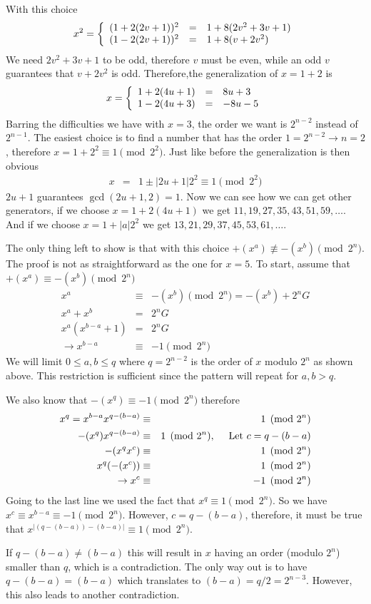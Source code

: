 \documentclass[aps,preprint,preprintnumbers,nofootinbib,showpacs,prd]{revtex4-1}
\newcommand{\ba}{\begin{array}}
\newcommand{\ea}{\end{array}}
\newcommand{\nbea}{\begin{eqnarray*}}
\newcommand{\neea}{\end{eqnarray*}}
\begin{document}
With this choice
%
\nbea
x^2 =  \left \{ \ba{l c l}
(1 + 2(2v+1))^2 & = & 1 + 8(2v^2 + 3v + 1) \\
(1 - 2(2v+1))^2 & = & 1 + 8(v + 2v^2)
\ea
\right.
\neea
%
We need $2v^2 + 3v + 1$ to be odd, therefore $v$ must be even, while an odd $v$ guarantees that $v + 2v^2$ is odd. Therefore,the generalization of $x = 1 + 2$ is
%
\nbea
x =  \left \{ \ba{l c l}
1 + 2(4u+1) & = & 8u + 3 \\
1 - 2(4u+3) & = & -8u - 5
\ea
\right.
\neea
%
Barring the difficulties we have with $x=3$, the order we want is $2^{n-2}$ instead of $2^{n-1}$. The easiest choice is to find a number that has the order $1 = 2^{n-2} \to n = 2$, therefore $x = 1 + 2^2 \equiv 1 \pmod{2^2}$. Just like before the generalization is then obvious
%
\nbea
x & = & 1 \pm |2u+1|2^2 \equiv 1 \pmod{2^2}
\neea
%
$2u+1$ guarantees $\gcd(2u+1,2) = 1$. Now we can see how we can get other generators, if we choose $x = 1 + 2(4u+1)$ we get $11, 19, 27, 35, 43, 51, 59, \dots$. And if we choose $x = 1 + |a|2^2$ we get $13, 21, 29, 37, 45, 53, 61, \dots$. 

The only thing left to show is that with this choice $+(x^a) \not\equiv -(x^b) \pmod{2^n}$. The proof is not as straightforward as the one for $x=5$. To start, assume that $+(x^a) \equiv -(x^b) \pmod{2^n}$
%
\nbea
x^a & \equiv & -(x^b) \pmod{2^n}  = -(x^b) + 2^n G\\
x^a + x^b & = & 2^n G \\
x^a(x^{b-a} + 1) & = & 2^n G \\
\to x^{b-a} & \equiv & -1 \pmod{2^n}
\neea
%
We will limit $0 \le a,b \le q$ where $q = 2^{n-2}$ is the order of $x$ modulo $2^n$ as shown above. This restriction is sufficient since the pattern will repeat for $a,b > q$.

We also know that $-(x^q) \equiv -1 \pmod{2^n}$ therefore
%
\nbea
x^q = x^{b-a} x ^{q - (b-a)} & \equiv & 1 \pmod{2^n} \\
-(x^q)x ^{q - (b-a)} & \equiv & 1 \pmod{2^n}, ~~~ {~\rm Let~} c = q - (b-a) \\
-(x^q x^c) & \equiv & 1 \pmod{2^n} \\
x^q (-(x^c)) & \equiv & 1 \pmod{2^n} \\
\to x^c & \equiv & -1 \pmod{2^n}
\neea
%
Going to the last line we used the fact that $x^q \equiv 1 \pmod{2^n}$. So we have $x^c \equiv x^{b-a} \equiv -1 \pmod{2^n}$. However, $c = q - (b-a)$, therefore, it must be true that $x^{|(q - (b-a)) - (b-a)|} \equiv 1 \pmod{2^n}$.

If $q - (b - a) \neq (b-a)$ this will result in $x$ having an order (modulo $2^n$) smaller than $q$, which is a contradiction. The only way out is to have $q - (b-a) = (b-a)$ which translates to $(b-a) = q/2 = 2^{n-3}$. However, this also leads to another contradiction.
\end{document}
